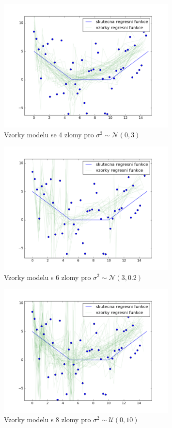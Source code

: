 \documentclass[czech,master,public,dept470,male,cpdeclaration,oneside, python]{diploma}
\begin{document}
\begin{figure}
	[H]\centering\includegraphics[width=0.8\textwidth]{images/priklad4_N03_lines.png}\caption{Vzorky  modelu se 4 zlomy pro $\sigma^2 \sim \mathcal{N}(0, 3)$}\label{sigmaU010}
\end{figure}

\begin{figure}
	[H]\centering\includegraphics[width=0.8\textwidth]{images/priklad4_N302_lines2.png}\caption{Vzorky  modelu s 6 zlomy pro $\sigma^2 \sim \mathcal{N}(3, 0.2)$}\label{sigmaU010}
\end{figure}

\begin{figure}
	[H]\centering\includegraphics[width=0.8\textwidth]{images/priklad4_U010_lines8.png}\caption{Vzorky modelu s 8 zlomy pro $\sigma^2 \sim \mathcal{U}(0, 10)$}\label{sigmaU010}
\end{figure}
\end{document}
